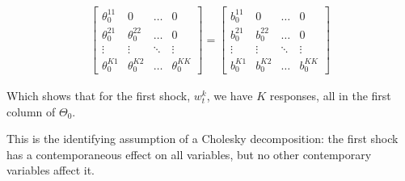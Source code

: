 \documentclass{article}
\begin{document}
\begin{align*}
  \begin{bmatrix}
    \theta_0^{11} & 0 & \dots & 0 \\
    \theta_0^{21} & \theta_0^{22} & \dots & 0 \\
    \vdots & \vdots & \ddots & \vdots \\
    \theta_0^{K1} & \theta_0^{K2} & \dots & \theta_0^{KK}
  \end{bmatrix}
  =
  \begin{bmatrix}
    b_0^{11} & 0 & \dots & 0 \\
    b_0^{21} & b_0^{22} & \dots & 0 \\
    \vdots & \vdots & \ddots & \vdots \\
    b_0^{K1} & b_0^{K2} & \dots & b_0^{KK}
  \end{bmatrix}
\end{align*}

Which shows that for the first shock, $w_t^k$, we have $K$ responses, all in the first column of $\Theta_0$.

This is the identifying assumption of a Cholesky decomposition: the first shock has a contemporaneous effect on all variables, but no other contemporary variables affect it.
\end{document}
